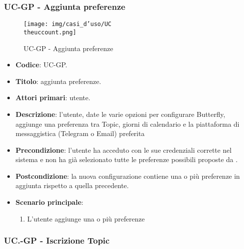 \subsubsection{UC\theuccount-GP - Aggiunta preferenze}
		\begin{figure}[H]
			\centering
				\texttt{[image: img/casi\_d'uso/UC\\theuccount.png]}\\
			\caption{UC\theuccount-GP - Aggiunta preferenze}
		\end{figure}
	\begin{itemize}
		\item \textbf{Codice}: UC\theuccount-GP.
		\item \textbf{Titolo}: aggiunta preferenze.
		\item \textbf{Attori primari}: utente.
		\item \textbf{Descrizione}: l’utente, date le varie opzioni per configurare Butterfly, aggiunge una
		preferenza tra Topic, giorni di calendario e la piattaforma di messaggistica (Telegram o Email) preferita
		\item \textbf{Precondizione}: l’utente ha acceduto con le sue credenziali corrette nel sistema e non ha già selezionato tutte le preferenze possibili proposte da \progetto.
		\item \textbf{Postcondizione}: la nuova configurazione contiene una o più preferenze in aggiunta rispetto a quella precedente.
		\item \textbf{Scenario principale}:
		\begin{enumerate}
			\item L'utente aggiunge una o più preferenze
		\end{enumerate}
	\end{itemize}

	\subsubsection{UC\theuccount.\thesubuccount-GP - Iscrizione Topic}

